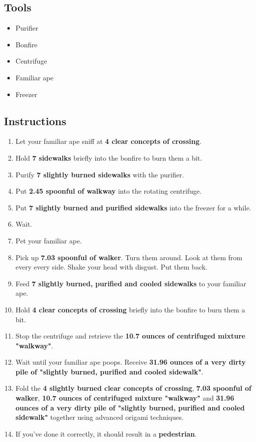 \documentclass{article}
\begin{document}
\subsection{Tools}\begin{itemize}
\item 
Purifier
\item 
Bonfire
\item 
Centrifuge
\item 
Familiar ape
\item 
Freezer
\end{itemize}
\subsection{Instructions}\begin{enumerate}
\item 
Let your familiar ape sniff at \textbf{4 clear concepts of crossing}.
\item 
Hold \textbf{7 sidewalks} briefly into the bonfire to burn them a bit.
\item 
Purify \textbf{7 slightly burned sidewalks} with the purifier.
\item 
Put \textbf{2.45 spoonful of walkway} into the rotating centrifuge.
\item 
Put \textbf{7 slightly burned and purified sidewalks} into the freezer for a while.
\item 
Wait.
\item 
Pet your familiar ape.
\item 
Pick up \textbf{7.03 spoonful of walker}. Turn them around. Look at them from every every side. Shake your head with disgust. Put them back.
\item 
Feed \textbf{7 slightly burned, purified and cooled sidewalks} to your familiar ape.
\item 
Hold \textbf{4 clear concepts of crossing} briefly into the bonfire to burn them a bit.
\item 
Stop the centrifuge and retrieve the \textbf{10.7 ounces of centrifuged mixture "walkway"}.
\item 
Wait until your familiar ape poops. Receive \textbf{31.96 ounces of a very dirty pile of "slightly burned, purified and cooled sidewalk"}.
\item 
Fold the \textbf{4 slightly burned clear concepts of crossing}, \textbf{7.03 spoonful of walker}, \textbf{10.7 ounces of centrifuged mixture "walkway"} and \textbf{31.96 ounces of a very dirty pile of "slightly burned, purified and cooled sidewalk"} together using advanced origami techniques.
\item 
If you've done it correctly, it should result in a \textbf{pedestrian}.
\end{enumerate}
\newpage
\end{document}
